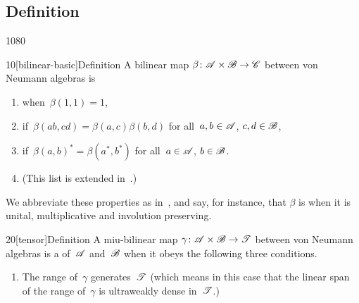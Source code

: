 \subsection{Definition}
\begin{parsec}{1080}%
\begin{point}{10}[bilinear-basic]{Definition}%
A bilinear map
	$\beta\colon \mathscr{A}\times \mathscr{B}\to\mathscr{C}$
between von Neumann algebras is
\begin{enumerate}
\item
{}%
when~$\beta(1,1)=1$,
\item
{}%
if~$\beta(ab,cd)=\beta(a,c)\beta(b,d)$
for all~$a,b\in\mathscr{A}$, $c,d\in\mathscr{B}$,
\item
{}
if~$\beta(a,b)^*=\beta(a^*,b^*)$
for all~$a\in\mathscr{A}$, $b\in\mathscr{B}$.
\item
(This list is extended in~.)
\end{enumerate}
We abbreviate these properties as in~,
and say, for instance, that $\beta$ is %
when it is unital, multiplicative and involution preserving.

\end{point}
\begin{point}{20}[tensor]{Definition}%
A miu-bilinear map $\gamma\colon \mathscr{A}\times\mathscr{B}\to\mathscr{T}$
between von Neumann algebras
is a %
of~$\mathscr{A}$ and~$\mathscr{B}$
when it obeys the following three conditions.
\begin{enumerate}
\item
\label{tensor-1}
The range of~$\gamma$ generates~$\mathscr{T}$
(which  means in this case that the linear span
of the range of~$\gamma$ is ultraweakly dense in~$\mathscr{T}$.)


\end{enumerate}
\end{point}
\end{parsec}
